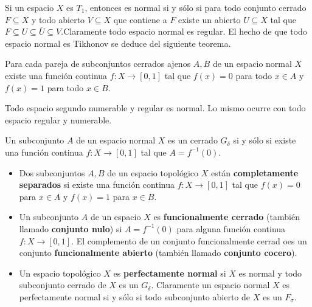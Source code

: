 \documentclass[12pt]{report}
\theoremstyle{largebreak}
\newcommand{\cf}[3]{\ensuremath{#1:#2\rightarrow#3}}
\begin{document}
    \begin{obs}
        Si un espacio $X$ es $T_1$, entonces es normal si y sólo si para todo conjunto cerrado $F\subseteq X$ y todo abierto $V\subseteq X$ que contiene a $F$ existe un abierto $U\subseteq X$ tal que $F\subseteq U\subseteq \overline{U}\subseteq V$.Claramente todo espacio normal es regular. El hecho de que todo espacio normal es Tikhonov se deduce del siguiente teorema.
    \end{obs}

    \begin{theor}
        Para cada pareja de subconjuntos cerrados ajenos $A,B$ de un espacio normal $X$ existe una función continua $\cf{f}{X}{[0,1]}$ tal que $f(x)=0$ para todo $x\in A$ y $f(x)=1$ para todo $x\in B$.
    \end{theor}
    
    \begin{obs}
        Todo espacio segundo numerable y regular es normal. Lo mismo ocurre con todo espacio regular y numerable.
    \end{obs}

    \begin{cor}
        Un subconjunto $A$ de un espacio normal $X$ es un cerrado $G_\delta$ si y sólo si existe una función continua $\cf{f}{X}{[0,1]}$ tal que $A=f^{-1}(0)$.
    \end{cor}

    \begin{mydef}
        \begin{itemize}
            \item Dos subconjuntos $A,B$ de un espacio topológico $X$ están \textbf{completamente separados} si existe una función continua $\cf{f}{X}{[0,1]}$ tal que $f(x)=0$ para $x\in A$ y $f(x)=1$ para $x\in B$.
            \item Un subconjunto $A$ de un espacio $X$ es \textbf{funcionalmente cerrado} (también llamado \textbf{conjunto nulo}) si $A=f^{-1}(0)$ para alguna función continua $\cf{f}{X}{[0,1]}$. El complemento de un conjunto funcionalmente cerrad oes un conjunto \textbf{funcionalmente abierto} (también llamado \textbf{conjunto cocero}).
            \item Un espacio topológico $X$ es \textbf{perfectamente normal} si $X$ es normal y todo subconjunto cerrado de $X$ es un $G_\delta$. Claramente un espacio normal $X$ es perfectamente normal si y sólo si todo subconjunto abierto de $X$ es un $F_\sigma$.
        \end{itemize}
    \end{mydef}
\end{document}
